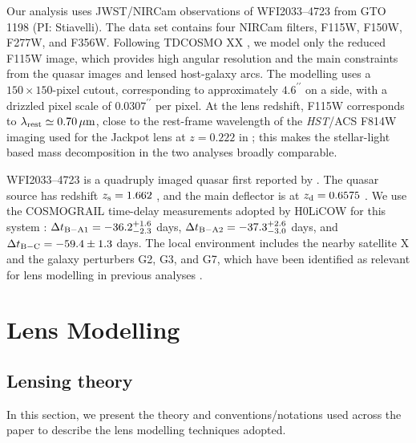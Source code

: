 \documentclass[fleqn,usenatbib]{mnras}
\begin{document}
Our analysis uses \textsc{JWST}/NIRCam observations of WFI2033--4723 from GTO 1198 (PI: Stiavelli). The data set contains four NIRCam filters, F115W, F150W, F277W, and F356W. Following TDCOSMO XX \citep{Williams2025TDCOSMOXX}, we model only the reduced F115W image, which provides high angular resolution and the main constraints from the quasar images and lensed host-galaxy arcs. The modelling uses a \(150\times150\)-pixel cutout, corresponding to approximately \(4.6^{\prime\prime}\) on a side, with a drizzled pixel scale of \(0.0307^{\prime\prime}\) per pixel. At the lens redshift, F115W corresponds to \(\lambda_{\rm rest}\simeq0.70\,\mu{\rm m}\), close to the rest-frame wavelength of the \textit{HST}/ACS F814W imaging used for the Jackpot lens at \(z=0.222\) in \citet{Tian2026}; this makes the stellar-light based mass decomposition in the two analyses broadly comparable.

WFI2033--4723 is a quadruply imaged quasar first reported by \citet{morgan2004}. The quasar source has redshift \(z_{\rm s}=1.662\) \citep{sluse2012}, and the main deflector is at \(z_{\rm d}=0.6575\) \citep{sluse2019}. We use the COSMOGRAIL time-delay measurements adopted by H0LiCOW for this system \citep{bonvin2019,rusu2020}: \(\Delta t_{\rm B-A1}=-36.2^{+1.6}_{-2.3}\) days, \(\Delta t_{\rm B-A2}=-37.3^{+2.6}_{-3.0}\) days, and \(\Delta t_{\rm B-C}=-59.4\pm1.3\) days. The local environment includes the nearby satellite X and the galaxy perturbers G2, G3, and G7, which have been identified as relevant for lens modelling in previous analyses \citep{sluse2019,rusu2020}.

\section{Lens Modelling}
\subsection{Lensing theory}
In this section, we present the theory and conventions/notations used across the paper to describe the lens modelling techniques adopted.
\end{document}
